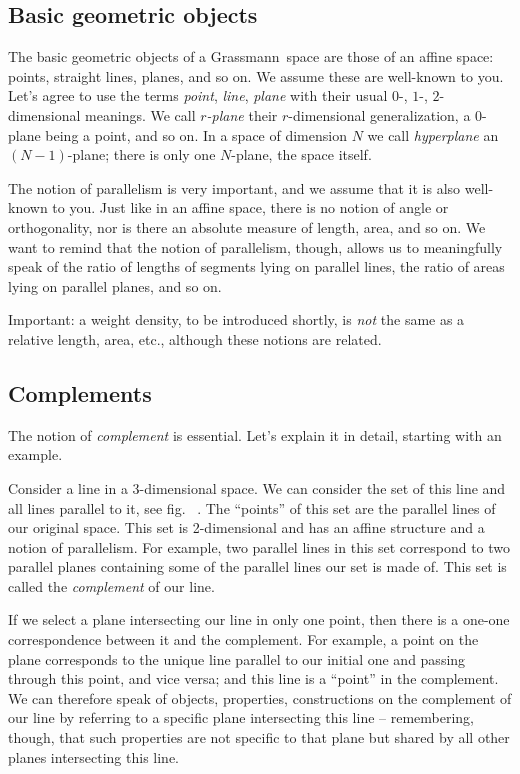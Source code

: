 \documentclass[\ifafour a4paper,12pt,\else a5paper,10pt,\fi%
onecolumn,oneside,article,%
british%
]{memoir}
\theoremstyle{remark}
\theoremstyle{innote}
\renewcommand*{\|}{\nonscript\,\vert\nonscript\;\mathopen{}}
\newcommand*{\fig}{fig.}%
\newcommand*{\etc}{{etc.}}
\newcommand*{\puzzle}{{\fontencoding{U}\fontfamily{fontawesometwo}\selectfont\symbol{225}}}
\newcommand{\mynote}[1]{ {\color{notecolour}\puzzle\ #1}}
\newcommand*{\gm}{Grassmann}
\newcommand*{\yr}{r}
\newcommand*{\yN}{N}
\begin{document}
\subsection{Basic geometric objects}
\label{sec:points_etc}

The basic geometric objects of a \gm\ space are those of an affine space:
points, straight lines, planes, and so on. We assume these are well-known
to you. Let's agree to use the terms \emph{point}, \emph{line},
\emph{plane} with their usual $0$-, $1$-, $2$-dimensional meanings. We call
\emph{$\yr$-plane} their $\yr$-dimensional generalization, a $0$-plane
being a point, and so on. In a space of dimension $\yN$ we call
\emph{hyperplane} an $(\yN-1)$-plane; there is only one $\yN$-plane, the
space itself.

The notion of parallelism is very important, and we assume that it is also
well-known to you. Just like in an affine space, there is no notion of
angle or orthogonality, nor is there an absolute measure of length, area,
and so on. We want to remind that the notion of parallelism, though, allows
us to meaningfully speak of the ratio of lengths of segments lying on
parallel lines, the ratio of areas lying on parallel planes, and so on.

Important: a weight density, to be introduced shortly, is \emph{not} the
same as a relative length, area, \etc, although these notions are related.

\subsection{Complements}
\label{sec:complements}

The notion of \emph{complement} is essential. Let's explain it in detail,
starting with an example.

Consider a line in a 3-dimensional space. We can consider the set of this
line and all lines parallel to it, see \fig\mynote{}. The \enquote{points} of
this set are the parallel lines of our original space. This set is
2-dimensional and has an affine structure and a notion of parallelism. For
example, two parallel lines in this set correspond to two parallel planes
containing some of the parallel lines our set is made of. This set is
called the \emph{complement} of our line.

If we select a plane intersecting our line in only one point, then there is
a one-one correspondence between it and the complement. For example, a
point on the plane corresponds to the unique line parallel to our initial
one and passing through this point, and vice versa; and this line is a
\enquote{point} in the complement. We can therefore speak of objects,
properties, constructions on the complement of our line by referring to a
specific plane intersecting this line -- remembering, though, that such
properties are not specific to that plane but shared by all other planes
intersecting this line.
\end{document}
